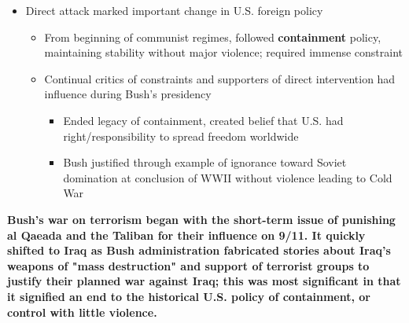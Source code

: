 \documentclass[a4paper]{article}
\begin{document}
{\begin{itemize}
\begin{itemize}
\begin{itemize}
                    \end{itemize}
                    \item Direct attack marked important change in U.S. foreign policy
                    \begin{itemize}
                        \item From beginning of communist regimes, followed \textbf{containment} policy, maintaining stability without major violence; required immense constraint
                        \item Continual critics of constraints and supporters of direct intervention had influence during Bush's presidency
                        \begin{itemize}
                            \item Ended legacy of containment, created belief that U.S. had right/responsibility to spread freedom worldwide
                            \item Bush justified through example of ignorance toward Soviet domination at conclusion of WWII without violence leading to Cold War
                        \end{itemize}
                    \end{itemize}
                \end{itemize}
            \end{itemize}
            \textbf{Bush's war on terrorism began with the short-term issue of punishing al Qaeada and the Taliban for their influence on 9/11. It quickly shifted to Iraq as Bush administration fabricated stories about Iraq's weapons of "mass destruction" and support of terrorist groups to justify their planned war against Iraq; this was most significant in that it signified an end to the historical U.S. policy of containment, or control with little violence.}
        }
\end{document}
